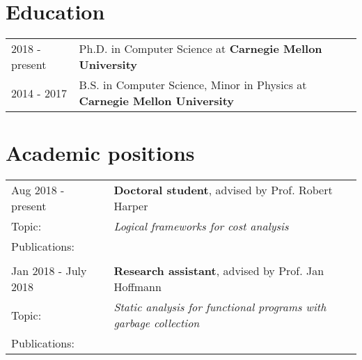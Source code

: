\documentclass[a4paper,12pt]{article}
\begin{document}


\section{Education}
\begin{tabularx}{\linewidth}{@{}l X@{}}	
2018 - present & Ph.D. in Computer Science at \textbf{Carnegie Mellon University} \hfill \normalsize \\

2014 - 2017 & B.S. in Computer Science, Minor in Physics at \textbf{Carnegie Mellon University} \hfill 
\end{tabularx}

\section{Academic positions}

\begin{tabularx}{\linewidth}{ @{}l X@{} }
  Aug 2018 - present & \textbf{Doctoral student}, advised by Prof. Robert Harper \\[3.75pt]
  Topic: & \emph{Logical frameworks for cost analysis}\\
  Publications: &\citet{niu-harper:2023,niu-sterling-grodin-harper:2022,grodin-niu-sterling-harper-2023}\\ \\ 
  Jan 2018 - July 2018 & \textbf{Research assistant}, advised by Prof. Jan Hoffmann \\[3.75pt]
  Topic: & \emph{Static analysis for functional programs with garbage collection}\\ 
  Publications: & \citet{niu-hoffmann:2018}
\end{tabularx}
\end{document}
